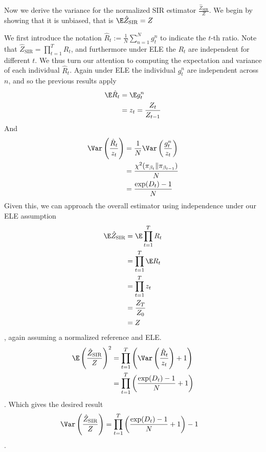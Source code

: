 \documentclass{article}
\begin{document}
\begin{enumerate}
    \newcommand{\SIR}{{\text{SIR}}}
    Now we derive the variance for the normalized SIR estimator
    $\frac{\hat Z_\SIR}{Z}$. We begin by showing that it is unbiased, that
    is $\E \hat Z_\SIR = Z$

    We first introduce the notation $\hat R_t := \frac{1}{N}\sum_{n=1}^N g^n_t$ to
    indicate the $t$-th ratio.
    Note that $\hat Z_\SIR = \prod_{t=1}^T R_t$, and furthermore under ELE the
    $R_t$ are independent for different $t$. We thus turn our attention to
    computing the expectation and variance of each individual $\hat R_t$. Again
    under ELE the individual $g^n_t$ are independent across $n$, and so the
    previous results apply
    \begin{align}
        \E \hat R_t &= \E g^n_t  \\
            &= z_t = \frac{Z_t}{Z_{t-1}}
    \end{align}
    And
    \begin{align}
        \Var \left(\frac{\hat R_t}{z_t}\right) &=
            \frac 1 N \Var \left( \frac{g^n_t}{z_t}\right) \\
            &= \frac {\chi^2(\pi_{\beta_t} \| \pi_{\beta_{t-1}})}{N}  \\
            &= \frac{\exp(D_t) - 1}{N}
    \end{align}
    Given this, we can approach the overall estimator using independence under
    our ELE assumption
    \begin{align}
        \E \hat Z_\SIR &= \E \prod_{t=1}^T R_t \\
        &= \prod_{t=1}^T \E R_t \\
        &= \prod_{t=1}^T z_t \\
        &= \frac{Z_T}{Z_0} \\
        &= Z
    \end{align},
    again assuming a normalized reference and ELE.
    \begin{align}
        \E\left( \frac{\hat Z_\SIR}{Z} \right)^2 &= 
            \prod_{t=1}^T \left( \Var \left( \frac{\hat R_t}{z_t} \right) + 1 \right) \\
            &= \prod_{t=1}^T \left(
               \frac{\exp(D_t) - 1}{N} + 1
            \right)
    \end{align}.
    Which gives the desired result
    \begin{align}
        \Var\left(\frac{\hat Z_\SIR}{Z} \right) &= 
            \prod_{t=1}^T \left(
               \frac{\exp(D_t) - 1}{N} + 1
            \right) - 1 
    \end{align}.

\end{enumerate}
\end{document}
